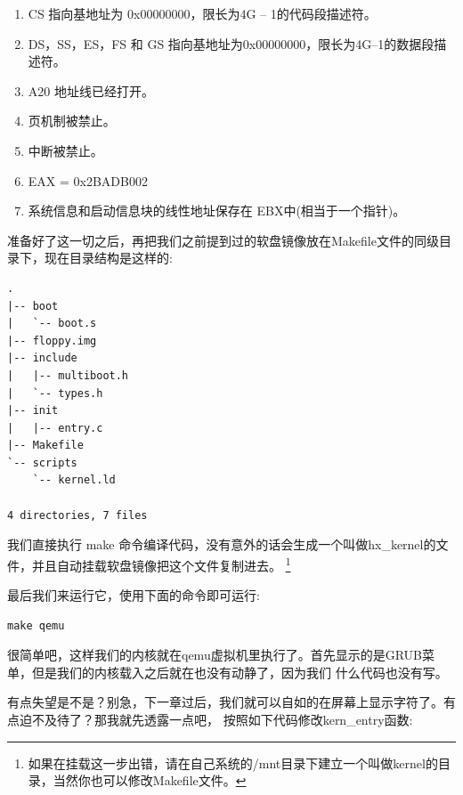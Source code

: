 \begin{mdframed}
	\begin{enumerate}
		\item CS 指向基地址为 0x00000000，限长为4G – 1的代码段描述符。
		\item DS，SS，ES，FS 和 GS 指向基地址为0x00000000，限长为4G–1的数据段描述符。
		\item A20 地址线已经打开。
		\item 页机制被禁止。
		\item 中断被禁止。
		\item EAX = 0x2BADB002
		\item 系统信息和启动信息块的线性地址保存在 EBX中(相当于一个指针)。
	\end{enumerate}
\end{mdframed}

\par 准备好了这一切之后，再把我们之前提到过的软盘镜像放在Makefile文件的同级目录下，现在目录结构是这样的:
\begin{Verbatim}[frame=single]
.
|-- boot
|   `-- boot.s
|-- floppy.img
|-- include
|   |-- multiboot.h
|   `-- types.h
|-- init
|   |-- entry.c
|-- Makefile
`-- scripts
    `-- kernel.ld

4 directories, 7 files
\end{Verbatim}

\par 我们直接执行 make 命令编译代码，没有意外的话会生成一个叫做hx\_kernel的文件，并且自动挂载软盘镜像把这个文件复制进去。\allowbreak
\footnote{如果在挂载这一步出错，请在自己系统的/mnt目录下建立一个叫做kernel的目录，当然你也可以修改Makefile文件。}

\par 最后我们来运行它，使用下面的命令即可运行:

\begin{Verbatim}[frame=single]
  make qemu
\end{Verbatim}

\par 很简单吧，这样我们的内核就在qemu虚拟机里执行了。首先显示的是GRUB菜单，但是我们的内核载入之后就在也没有动静了，因为我们\allowbreak
什么代码也没有写。

\par 有点失望是不是？别急，下一章过后，我们就可以自如的在屏幕上显示字符了。有点迫不及待了？那我就先透露一点吧，\allowbreak
按照如下代码修改kern\_entry函数:

